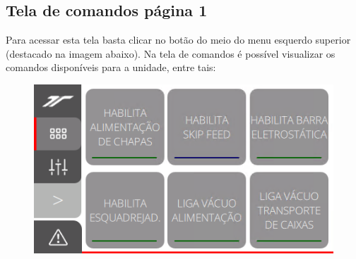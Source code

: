 \newpage
\thispagestyle{fancy}
\vspace*{40 pt}
\subsection{Tela de comandos página 1}\label{ihmAlimentacaoTelaComandosPagina1}

Para acessar esta tela basta clicar no botão do meio do menu esquerdo superior (destacado na imagem abaixo).
 Na tela de comandos é possível visualizar os comandos disponíveis para a unidade, entre tais:




\vspace*{\fill}
\begin{figure}[h]
  \centering
  \includegraphics{src/imagesFlexo/11-IHMALM/e-2.png}
\end{figure}
\vspace*{\fill}

